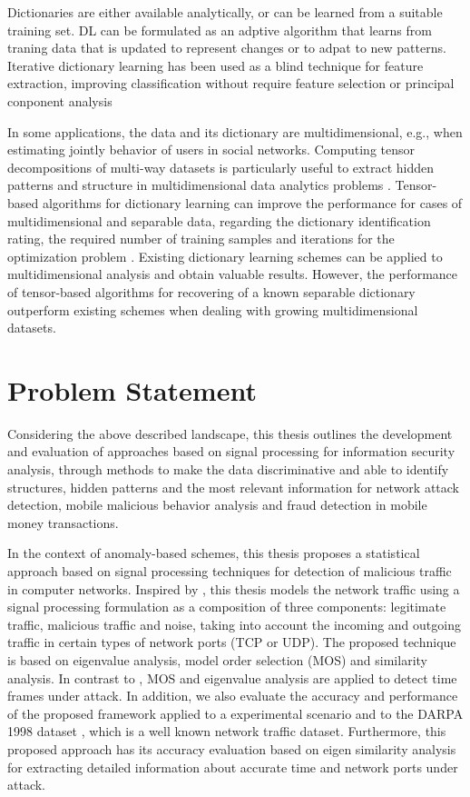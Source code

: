 Dictionaries are either available analytically, or can be learned from a suitable training set. DL can be formulated as an adptive algorithm that learns from traning data that is updated to represent changes or to adpat to new patterns. Iterative dictionary learning has been used as a blind technique for feature extraction, improving classification without require feature selection or principal conponent analysis

In some applications, the data and its dictionary are multidimensional, e.g., when estimating jointly behavior of users in social networks. Computing tensor decompositions of multi-way datasets is particularly useful to extract hidden patterns and structure in multidimensional data analytics problems \cite{kolda2009tensor}. Tensor-based algorithms for dictionary learning can improve the performance for cases of multidimensional and separable data, regarding the dictionary identification rating, the required number of training samples and iterations for the optimization problem \cite{roemer2014tensor}. Existing dictionary learning schemes can be applied to multidimensional analysis and obtain valuable results. However, the performance of tensor-based algorithms for recovering of a known separable dictionary outperform existing schemes when dealing with growing multidimensional datasets.


\section{Problem Statement}
\label{sc:problems}

Considering the above described landscape, this thesis outlines the development and evaluation of approaches based on signal processing for information security analysis, through methods to make the data discriminative and able to identify structures, hidden patterns and the most relevant information for network attack detection, mobile malicious behavior analysis and fraud detection in mobile money transactions.

In the context of anomaly-based schemes, this thesis proposes a statistical approach based on signal processing techniques for detection of malicious traffic in computer networks. Inspired by \cite{david2011blind,da2012improved}, this thesis models the network traffic using a signal processing formulation as a composition of three components: legitimate traffic, malicious traffic and noise, taking into account the incoming and outgoing traffic in certain types of network ports (TCP or UDP). The proposed technique is based on eigenvalue analysis, model order selection (MOS) and similarity analysis. In contrast to \cite{david2011blind,da2012improved,tenorio2013greatest}, MOS and eigenvalue analysis are applied to detect time frames under attack. In addition, we also evaluate the accuracy and performance of the proposed framework applied to a experimental scenario and to the DARPA 1998 dataset \citep{osanaiye2016distributed}, which is a well known network traffic dataset. Furthermore, this proposed approach has its accuracy evaluation based on eigen similarity analysis for extracting detailed information about accurate time and network ports under attack.

